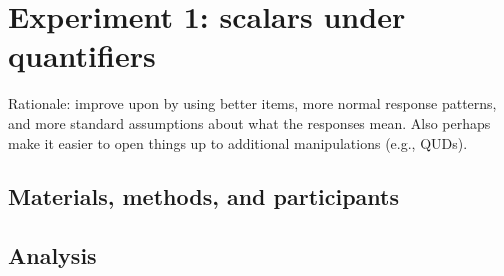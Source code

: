 \documentclass{article}
\begin{document}
\newpage




\section{Experiment 1: scalars under quantifiers}\label{sec:exp1}

Rationale: improve upon \citet{Chemla:Spector:2011} by using better
items, more normal response patterns, and more standard assumptions
about what the responses mean. Also perhaps make it easier to open
things up to additional manipulations (e.g., QUDs).


\subsection{Materials, methods, and participants}


\subsection{Analysis}
\end{document}
